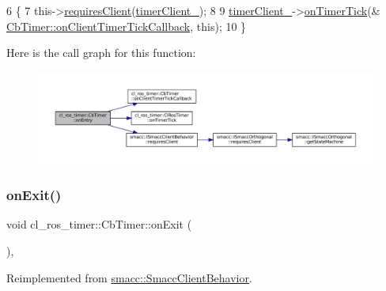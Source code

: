 \begin{DoxyCode}
6 \{
7     this->\hyperlink{classsmacc_1_1ISmaccClientBehavior_a32b16e99e3b4cb289414203dc861a440}{requiresClient}(\hyperlink{classcl__ros__timer_1_1CbTimer_aefff167dbfbc54485f700a2c6b2479a5}{timerClient\_});
8 
9     \hyperlink{classcl__ros__timer_1_1CbTimer_aefff167dbfbc54485f700a2c6b2479a5}{timerClient\_}->\hyperlink{classcl__ros__timer_1_1ClRosTimer_a7edcc057bfb5a25fe0892755137dd8da}{onTimerTick}(&
      \hyperlink{classcl__ros__timer_1_1CbTimer_a9895eb7e05a5922fa27f2bc46f5486a0}{CbTimer::onClientTimerTickCallback}, \textcolor{keyword}{this});
10 \}
\end{DoxyCode}
Here is the call graph for this function\+:
\nopagebreak
\begin{figure}[H]
\begin{center}
\leavevmode
\includegraphics[width=350pt]{classcl__ros__timer_1_1CbTimer_aceba45e86271cf1b7333e2f42c246a38_cgraph}
\end{center}
\end{figure}
\mbox{\label{classcl__ros__timer_1_1CbTimer_a04184e2679c32363c876e1d6b4746072}} 
\subsubsection{\texorpdfstring{on\+Exit()}{onExit()}}
{\footnotesize\ttfamily void cl\+\_\+ros\+\_\+timer\+::\+Cb\+Timer\+::on\+Exit (\begin{DoxyParamCaption}{ }\end{DoxyParamCaption})\hspace{0.3cm}{\ttfamily [override]}, {\ttfamily [virtual]}}



Reimplemented from \hyperlink{classsmacc_1_1SmaccClientBehavior_a7e4fb6ce81ff96dc172425852d69c0c5}{smacc\+::\+Smacc\+Client\+Behavior}.



